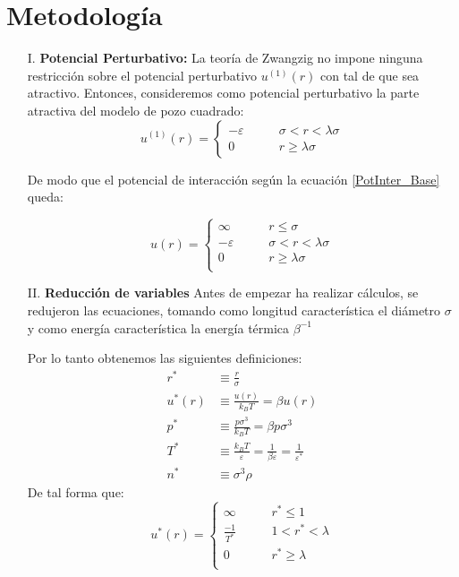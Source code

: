 \documentclass[12pt,letterpaper]{article}
\begin{document}
\section{Metodología}
\begin{enumerate}
\item[I.]\textbf{Potencial Perturbativo:} La teoría de Zwangzig no impone ninguna restricción sobre el potencial perturbativo $u^{(1)}(r)$ con tal de que sea atractivo. Entonces, consideremos  como potencial  perturbativo la parte atractiva del modelo de pozo cuadrado:
\begin{equation}
	u^{(1)}(r) =
	\left\{
	\begin{aligned}
        -\varepsilon &  \qquad \sigma < r < \lambda\sigma\\
		0 & \qquad r \geq \lambda\sigma 
    \end{aligned}
    \right.
	\label{Pozo}
\end{equation}

De modo que el potencial de interacción según la ecuación \eqref{PotInter_Base} queda:

\begin{equation}
	u(r)=
	\left\{
	\begin{aligned}
		\infty & \qquad r \leq \sigma \\
        -\varepsilon &  \qquad \sigma < r < \lambda\sigma\\
		0 & \qquad r \geq \lambda\sigma \\
	\end{aligned}
    \right.
	\label{PotInteracTotal}
\end{equation}

\item[II.] \textbf{Reducción de variables} Antes de empezar ha realizar cálculos, se redujeron las ecuaciones, tomando como longitud característica el diámetro $\sigma$ y como energía característica la energía térmica $\beta^{-1}$

Por lo tanto obtenemos las siguientes definiciones:
\begin{align}
	r^* &\equiv \frac{r}{\sigma} \label{rRed} \\
	u^*(r) &\equiv \frac{u(r)}{k_B T} = \beta u(r) \label{potRed}\\
	p^* &\equiv \frac{p\sigma^3}{k_B T} =\beta p\sigma^3 \label{presRed}\\
	T^* &\equiv \frac{k_B T}{\varepsilon} =\frac{1}{\beta \varepsilon} = \frac{1}{\varepsilon^*} \label{TempRed} \\
	n^* &\equiv \sigma^3\rho \label{ConsRed}
\end{align}
 De tal forma que:
\begin{equation}
	u^*(r)=
	\left\{
	\begin{aligned}
		\infty & \qquad r^* \leq 1 \\
        \frac{-1}{T^*} &  \qquad 1 < r^* < \lambda\\
		0 & \qquad r^* \geq \lambda \\
	\end{aligned}
    \right.
	\label{PotInteracTotal_Red}
\end{equation}



\end{enumerate}
\end{document}
